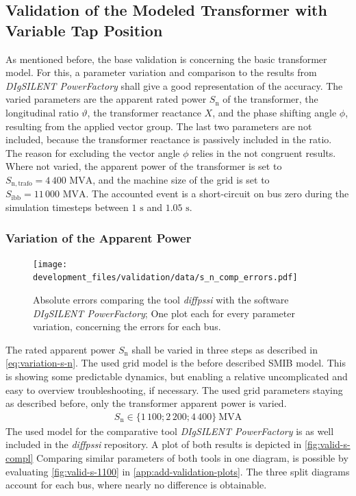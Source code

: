 \subsection{Validation of the Modeled Transformer with Variable Tap Position}

As mentioned before, the base validation is concerning the basic transformer model.
For this, a parameter variation and comparison to the results from \textit{DIgSILENT PowerFactory} shall give a good representation of the accuracy.
The varied parameters are the apparent rated power $S_\mathrm{n}$ of the transformer, the longitudinal ratio $\vartheta$, the transformer reactance $X$, and the phase shifting angle $\phi$, resulting from the applied vector group.
The last two parameters are not included, because the transformer reactance is passively included in the ratio.
The reason for excluding the vector angle $\phi$ relies in the not congruent results.
Where not varied, the apparent power of the transformer is set to $S_\mathrm{n,trafo}=4\,400\text{ MVA}$, and the machine size of the grid is set to $S_\mathrm{ibb}=11\,000\text{ MVA}$.
The accounted event is a short-circuit on bus zero during the simulation timesteps between $1\text{ s}$ and $1.05\text{ s}$.

\subsubsection{Variation of the Apparent Power}

\begin{figure}[htb!]
    \centering
    \texttt{[image: development\_files/validation/data/s\_n\_comp\_errors.pdf]}
    \caption[Model error comparison concerning the variation of the rated apparent power]{Absolute errors comparing the tool \textit{diffpssi} with the software \textit{DIgSILENT PowerFactory}; One plot each for every parameter variation, concerning the errors for each bus.}
    \label{fig:valid-s-errors}
\end{figure}

The rated apparent power $S_\mathrm{n}$ shall be varied in three steps as described in \autoref{eq:variation-s-n}. 
The used grid model is the before described \acs{SMIB} model. 
This is showing some predictable dynamics, but enabling a relative uncomplicated and easy to overview troubleshooting, if necessary.
The used grid parameters staying as described before, only the transformer apparent power is varied.
\begin{align}
    S_\mathrm{n} \in \{ 1\,100; 2\,200; 4\,400 \}~\mathrm{MVA} \label{eq:variation-s-n}
\end{align}
The used model for the comparative tool \textit{DIgSILENT PowerFactory} is as well included in the \textit{diffpssi} repository.
A plot of both results is depicted in \autoref{fig:valid-s-compl}
Comparing similar parameters of both tools in one diagram, is possible by evaluating \autoref{fig:valid-s-1100} in \autoref{app:add-validation-plots}.
The three split diagrams account for each bus, where nearly no difference is obtainable.

